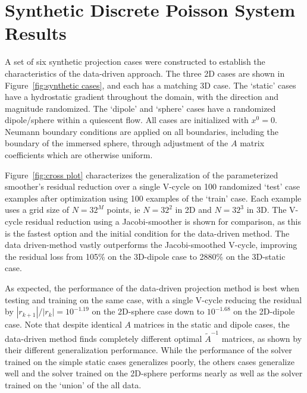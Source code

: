 \documentclass[review]{elsarticle}
\begin{document}
\section{Synthetic Discrete Poisson System Results}

A set of six synthetic projection cases were constructed to establish the characteristics of the data-driven approach. The three 2D cases are shown in Figure~\ref{fig:synthetic cases}, and each has a matching 3D case. The `static' cases have a hydrostatic gradient throughout the domain, with the direction and magnitude randomized. The `dipole' and `sphere' cases have a randomized dipole/sphere within a quiescent flow. All cases are initialized with $x^0=0$.
Neumann boundary conditions are applied on all boundaries, including the boundary of the immersed sphere, through adjustment of the $A$ matrix coefficients which are otherwise uniform. 

Figure~\ref{fig:cross plot} characterizes the generalization of the parameterized smoother's residual reduction over a single V-cycle on 100 randomized `test' case examples after optimization using 100 examples of the `train' case. Each example uses a grid size of $N=32^M$ points, ie $N=32^2$ in 2D and $N=32^3$ in 3D. The V-cycle residual reduction using a Jacobi-smoother is shown for comparison, as this is the fastest option and the initial condition for the data-driven method. The data driven-method vastly outperforms the Jacobi-smoothed V-cycle, improving the residual loss from 105\% on the 3D-dipole case to 2880\% on the 3D-static case.

As expected, the performance of the data-driven projection method is best when testing and training on the same case, with a single V-cycle reducing the residual by $|r_{k+1}|/|r_k|=10^{-1.19}$ on the 2D-sphere case down to $10^{-1.68}$ on the 2D-dipole case. Note that despite identical $A$ matrices in the static and dipole cases, the data-driven method finds completely different optimal $\tilde A^{-1}$ matrices, as shown by their different generalization performance. While the performance of the solver trained on the simple static cases generalizes poorly, the others cases generalize well and the solver trained on the 2D-sphere performs nearly as well as the solver trained on the `union' of the all data. 
\end{document}
